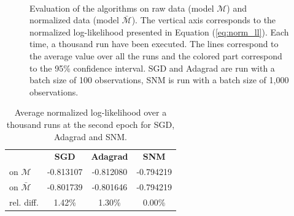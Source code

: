 \documentclass[conference]{IEEEtran}
\begin{document}
\begin{figure}[t]
    \centering
    ~
    ~
    \caption{Evaluation of the algorithms on raw data (model $\mathcal{M}$) and normalized data (model $\bar{\mathcal{M}}$). The vertical axis corresponds to the normalized log-likelihood presented in Equation (\ref{eq:norm_ll}). Each time, a thousand run have been executed. The lines correspond to the average value over all the runs and the colored part correspond to the 95\% confidence interval. SGD and Adagrad are run with a batch size of 100 observations, SNM is run with a batch size of 1,000 observations.}
    \label{fig:norm_unorm}
    \vspace{-0.5cm}
\end{figure}

\begin{table}
\centering
\renewcommand\arraystretch{1.2}
\begin{tabular}{l|ccc}
\multicolumn{1}{l}{} & {\bf SGD} & {\bf Adagrad} & {\bf SNM} \\ \cline{2-4}
on $\mathcal{M}$ & -0.813107 & -0.812080 & -0.794219 \\
on $\bar{\mathcal{M}}$ & -0.801739 & -0.801646
 & -0.794219 \\ \hline
rel. diff.  & 1.42\% & 1.30\% & 0.00\%
\end{tabular}
\caption{\label{tab:res_norm_unorm} Average normalized log-likelihood over a thousand runs at the second epoch for SGD, Adagrad and SNM.}
\vspace{-0.5cm}
\end{table}
\end{document}
